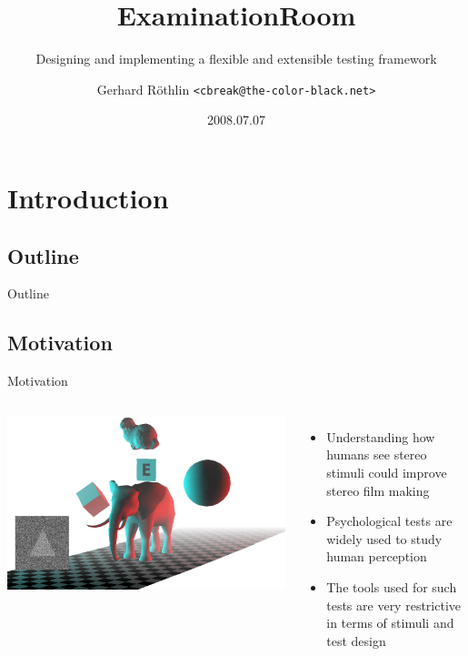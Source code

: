 \documentclass[12pt,ucs,hyperref={pdftext}]{beamer}
\title{ExaminationRoom}
\subtitle{Designing and implementing a flexible and extensible testing framework}
\author[gerhardr]{Gerhard R\"othlin {\tt\normalsize <cbreak@the-color-black.net>}}
\date{2008.07.07}
\newif\ifpdf
\newlength{\columnleft}
\newlength{\columnright}
\begin{document}
\ifpdf
\DeclareGraphicsExtensions{.pdf, .jpg, .tif, .tiff, .png}
\else
{}
\fi

\begin{frame}

\titlepage

\end{frame}



\section{Introduction}

\subsection{Outline}

\begin{frame}{Outline}
\begin{multicols}{2}
\tableofcontents
\end{multicols}
\end{frame}


\subsection{Motivation}

\begin{frame}{Motivation}
\begin{columns}

\column{\columnleft}
\includegraphics[width=\columnleft]{media/title.png}

\column{\columnright}
\begin{itemize}%
\item Understanding how humans see stereo stimuli could improve stereo film making
\item Psychological tests are widely used to study human perception
\item The tools used for such tests are very restrictive in terms of stimuli and test design
\end{itemize}

\end{columns}
\end{frame}
\end{document}
